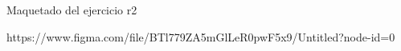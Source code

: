 
 Maquetado del ejercicio r2
 
https://www.figma.com/file/BTl779ZA5mGlLeR0pwF5x9/Untitled?node-id=0%